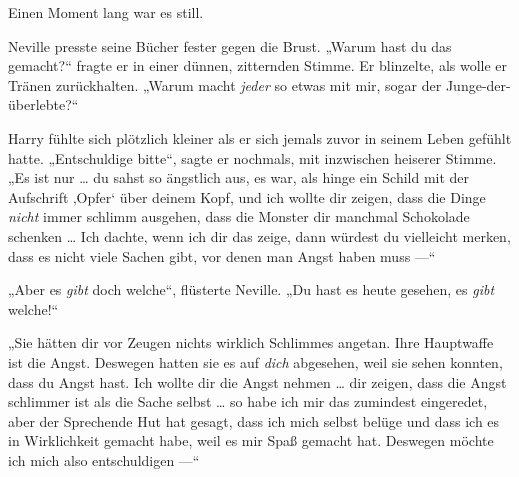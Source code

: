 Einen Moment lang war es still.

Neville presste seine Bücher fester gegen die Brust.
„Warum hast du das gemacht?“ fragte er in einer dünnen, zitternden Stimme. Er blinzelte, als wolle er Tränen zurückhalten.
„Warum macht \emph{jeder} so etwas mit mir, sogar der Junge-der-überlebte?“

Harry fühlte sich plötzlich kleiner als er sich jemals zuvor in seinem Leben gefühlt hatte.
„Entschuldige bitte“, sagte er nochmals, mit inzwischen heiserer Stimme.
„Es ist nur … du sahst so ängstlich aus, es war, als hinge ein Schild mit der Aufschrift ‚Opfer‘ über deinem Kopf, und ich wollte dir zeigen, dass die Dinge \emph{nicht} immer schlimm ausgehen, dass die Monster dir manchmal Schokolade schenken … Ich dachte, wenn ich dir das zeige, dann würdest du vielleicht merken, dass es nicht viele Sachen gibt, vor denen man Angst haben muss —“

„Aber es \emph{gibt} doch welche“, flüsterte Neville.
„Du hast es heute gesehen, es \emph{gibt} welche!“

„Sie hätten dir vor Zeugen nichts wirklich Schlimmes angetan. Ihre Hauptwaffe ist die Angst. Deswegen hatten sie es auf \emph{dich} abgesehen, weil sie sehen konnten, dass du Angst hast. Ich wollte dir die Angst nehmen … dir zeigen, dass die Angst schlimmer ist als die Sache selbst … so habe ich mir das zumindest eingeredet, aber der Sprechende Hut hat gesagt, dass ich mich selbst belüge und dass ich es in Wirklichkeit gemacht habe, weil es mir Spaß gemacht hat. Deswegen möchte ich mich also entschuldigen —“

